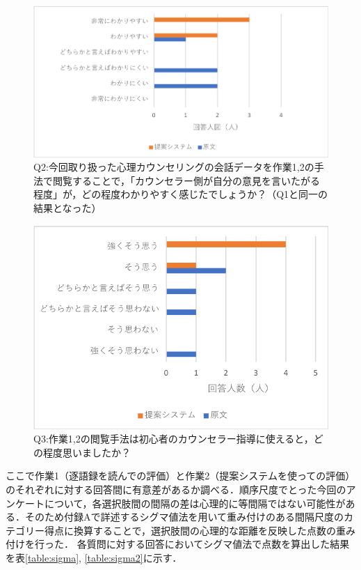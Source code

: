 \documentclass[shuuron]{kuee}
\begin{document}
\begin{figure}
  \begin{center}
    \includegraphics[width=\linewidth]{q1.png}
  \end{center}
  \caption{Q2:今回取り扱った心理カウンセリングの会話データを作業1,2の手法で閲覧することで，「カウンセラー側が自分の意見を言いたがる程度」が，どの程度わかりやすく感じたでしょうか？（Q1と同一の結果となった）}
  \label{fig:q2}
\end{figure}

\begin{figure}
  \begin{center}
    \includegraphics[width=\linewidth]{q3.png}
  \end{center}
  \caption{Q3:作業1,2の閲覧手法は初心者のカウンセラー指導に使えると，どの程度思いましたか？}
  \label{fig:q3}
\end{figure}

ここで作業1（逐語録を読んでの評価）と作業2（提案システムを使っての評価）のそれぞれに対する回答間に有意差があるか調べる．順序尺度でとった今回のアンケートについて，各選択肢間の間隔の差は心理的に等間隔ではない可能性がある．そのため付録Aで詳述するシグマ値法を用いて重み付けのある間隔尺度のカテゴリー得点に換算することで，選択肢間の心理的な距離を反映した点数の重み付けを行った．
各質問に対する回答においてシグマ値法で点数を算出した結果を表\ref{table:sigma}, \ref{table:sigma2}に示す．
\end{document}
